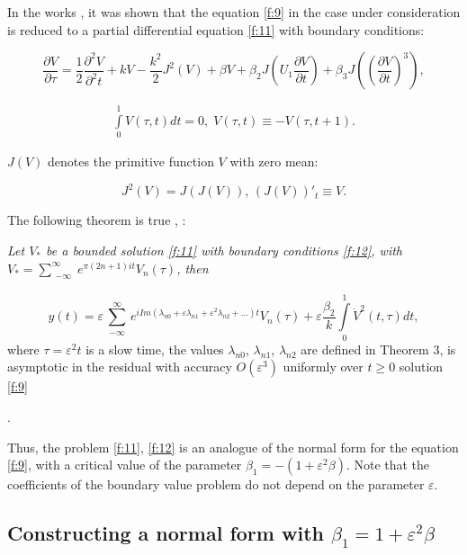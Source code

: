 \documentclass[12pt]{article} %
\newcommand{\eps}{\varepsilon}
\begin{document}
In the works \cite{M2}, \cite{M3} it was shown that the equation \eqref{f:9} in the case under consideration is reduced to a partial differential equation \eqref{f:11} with boundary conditions:

\begin{equation}
\displaystyle\frac{\partial V}{\partial \tau}=\frac{1}{2}\frac{\partial^2 V}{\partial^2 t}+kV-\frac{k^2}{2}J^2(V)+\beta V+ \beta_2J\left(U_1\frac{\partial V}{\partial t}\right)+\beta_3J\left(\left(\frac{\partial V}{\partial t}\right)^3\right),
\label{f:11}
\end{equation}

\begin{equation}
\begin{array}{cc}
\int\limits_0^1V(\tau,t)dt=0,\;V(\tau,t) \equiv -V(\tau,t+1).
\end{array}
\label{f:12}
\end{equation}

\noindent $J(V)$ denotes the primitive function $V$ with zero mean:

\[
J^2(V)=J(J(V)),\,(J(V))'_t\equiv V.
\]

The following theorem is true \cite{M2}, \cite{M3}:

 {\sl Let \(V_*\) be a bounded solution \eqref{f:11} with boundary conditions \eqref{f:12}, with \(V_*=\sum\limits_{\substack{ -\infty}}^\infty e^{\pi(2n+1)i t}V_n(\tau)\), then

\[
y(t)=\eps\sum\limits_{\substack{ -\infty }}^\infty e^{iIm(\lambda_{n0}+ \varepsilon\lambda_{n1}+\varepsilon^{2}\lambda_{n2}+\ldots) t}V_n(\tau)+\eps \dfrac{\beta_2}{k}\int\limits_0^1\dot{V}^2(t,\tau)dt,
\]
\noindent where $\tau=\eps^2 t$ is a slow time, the values \(\lambda_{n0}\), \(\lambda_{n1}\), \(\lambda_{n2}\) are defined in Theorem 3, is asymptotic in the residual with accuracy $O(\eps^3)$ uniformly over \(t\geq 0\) solution \eqref{f:9}}.

Thus, the problem \eqref{f:11}, \eqref{f:12} is an analogue of the normal form for the equation \eqref{f:9}, with a critical value of the parameter $\beta_1=-(1+\eps^2\beta)$. Note that the coefficients of the boundary value problem do not depend on the parameter $\eps$.










\subsection{Constructing a normal form with $\beta_1=1+\eps^2\beta$ }
\end{document}
